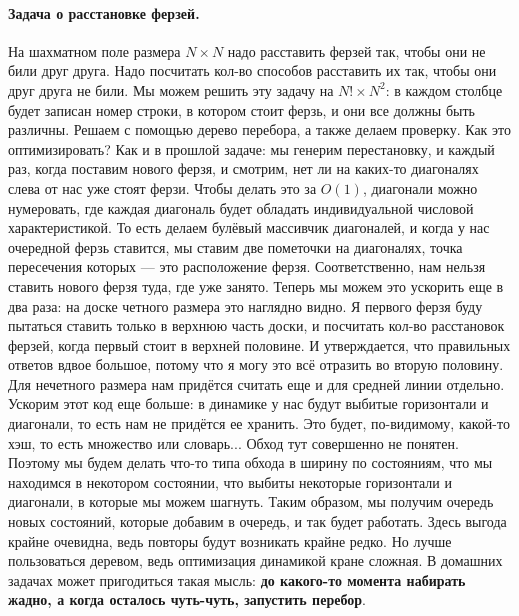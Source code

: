 \documentclass[12pt]{article}
\begin{document}
\paragraph{Задача о расстановке ферзей.} 
На шахматном поле размера $N\times N$ надо расставить ферзей так, чтобы они не били друг друга. Надо посчитать кол-во способов расставить их так, чтобы они друг друга не били. Мы можем решить эту задачу на $N!\times N^2$: в каждом столбце будет записан номер строки, в котором стоит ферзь, и они все должны быть различны. Решаем с помощью дерево перебора, а также делаем проверку. Как это оптимизировать? Как и в прошлой задаче: мы генерим перестановку, и каждый раз, когда поставим нового ферзя, и смотрим, нет ли на каких-то диагоналях слева от нас уже стоят ферзи. Чтобы делать это за $O(1)$, диагонали можно нумеровать, где каждая диагональ будет обладать индивидуальной числовой характеристикой. То есть делаем булёвый массивчик диагоналей, и когда у нас очередной ферзь ставится, мы ставим две пометочки на диагоналях, точка пересечения которых --- это расположение ферзя. Соответственно, нам нельзя ставить нового ферзя туда, где уже занято. Теперь мы можем это ускорить еще в два раза: на доске четного размера это наглядно видно. Я первого ферзя буду пытаться ставить только в верхнюю часть доски, и посчитать кол-во расстановок ферзей, когда первый стоит в верхней половине. И утверждается, что правильных ответов вдвое большое, потому что я могу это всё отразить во вторую половину. Для нечетного размера нам придётся считать еще и для средней линии отдельно. Ускорим этот код еще больше: в динамике у нас будут выбитые горизонтали и диагонали, то есть нам не придётся ее хранить. Это будет, по-видимому, какой-то хэш, то есть множество или словарь... Обход тут совершенно не понятен. Поэтому мы будем делать что-то типа обхода в ширину по состояниям, что мы находимся в некотором состоянии, что выбиты некоторые горизонтали и диагонали, в которые мы можем шагнуть. Таким образом, мы получим очередь новых состояний, которые добавим в очередь, и так будет работать. Здесь выгода крайне очевидна, ведь повторы будут возникать крайне редко. Но лучше пользоваться деревом, ведь оптимизация динамикой кране сложная. В домашних задачах может пригодиться такая мысль: \textbf{до какого-то момента набирать жадно, а когда осталось чуть-чуть, запустить перебор}. 
\end{document}
